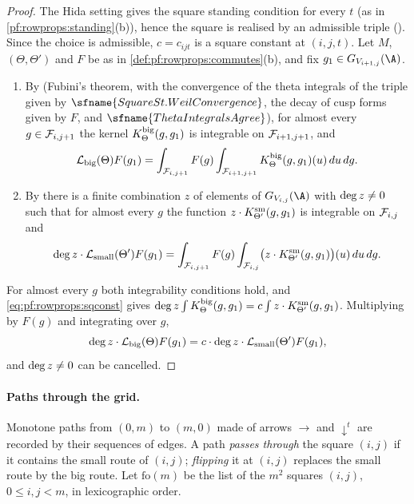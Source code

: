 \begin{proof}
The Hida setting gives the square standing condition for every $t$ (as in \cref{pf:rowprops:standing}(b)), hence the
square is realised by an admissible triple (). Since the choice is
admissible, $c=c_{ijt}$ is a square constant at $(i,j,t)$. Let $M$, $(\Theta,\Theta')$ and $F$ be as in
\cref{def:pf:rowprops:commutes}(b), and fix $g_1\in G_{V_{i+1,j}}(\A)$.
\begin{enumerate}[label=(\arabic*)]
\item By  (Fubini's theorem, with the convergence of
the theta integrals of the triple given by $\sfname{SquareSt.WeilConvergence}$, the decay of cusp forms given by $F$, and
$\sfname{ThetaIntegralsAgree}$), for almost every $g\in\mathcal{F}_{i,j+1}$ the kernel $K^{\mathrm{big}}_\Theta(g,g_1)$ is
integrable on $\mathcal{F}_{i+1,j+1}$, and
\[
\mathcal{L}_{\mathrm{big}}(\Theta)F(g_1)=\int_{\mathcal{F}_{i,j+1}}F(g)\int_{\mathcal{F}_{i+1,j+1}}K^{\mathrm{big}}_\Theta(g,g_1)(u)\,du\,dg .
\]
\item By  there is a finite combination $z$ of
elements of $G_{V_{i,j}}(\A)$ with $\deg z\neq0$ such that for almost every $g$ the function
$z\cdot K^{\mathrm{sm}}_{\Theta'}(g,g_1)$ is integrable on $\mathcal{F}_{i,j}$ and
\[
\deg z\cdot\mathcal{L}_{\mathrm{small}}(\Theta')F(g_1)=\int_{\mathcal{F}_{i,j+1}}F(g)\int_{\mathcal{F}_{i,j}}
\bigl(z\cdot K^{\mathrm{sm}}_{\Theta'}(g,g_1)\bigr)(u)\,du\,dg .
\]
\end{enumerate}
For almost every $g$ both integrability conditions hold, and \eqref{eq:pf:rowprops:sqconst} gives
$\deg z\int K^{\mathrm{big}}_\Theta(g,g_1)=c\int z\cdot K^{\mathrm{sm}}_{\Theta'}(g,g_1)$. Multiplying by $F(g)$ and
integrating over $g$,
\[
\deg z\cdot\mathcal{L}_{\mathrm{big}}(\Theta)F(g_1)=c\cdot\deg z\cdot\mathcal{L}_{\mathrm{small}}(\Theta')F(g_1),
\]
and $\deg z\ne0$ can be cancelled.
\end{proof}

\paragraph{Paths through the grid.}
Monotone paths from $(0,m)$ to $(m,0)$ made of arrows $\rightarrow$ and $\downarrow^t$ are recorded by their sequences of
edges. A path \emph{passes through} the square $(i,j)$ if it contains the small route of $(i,j)$; \emph{flipping} it at
$(i,j)$ replaces the small route by the big route. Let $\mathrm{fo}(m)$ be the list of the $m^2$ squares $(i,j)$,
$0\le i,j<m$, in lexicographic order.


